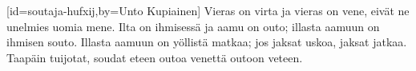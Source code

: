 

[id={soutaja-hufxij},by={Unto Kupiainen}]
  \beginverse
    Vieras on virta ja vieras on vene,
    eivät ne unelmies uomia mene.
    Ilta on ihmisessä ja aamu on outo;
    illasta aamuun on ihmisen souto.
    Illasta aamuun on yöllistä matkaa;
    jos jaksat uskoa, jaksat jatkaa.
    Taapäin tuijotat, soudat eteen
    outoa venettä outoon veteen.
  \endverse
\endsong


